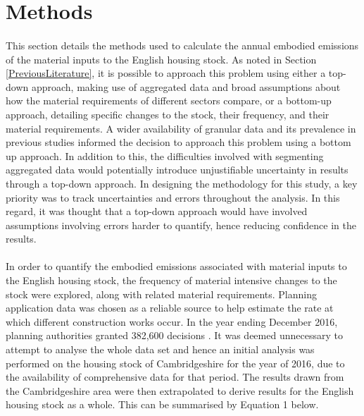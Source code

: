 \documentclass[12pt]{article}
\begin{document}

\section{Methods}
\label{methods}

\paragraph{}
This section details the methods used to calculate the annual embodied emissions of the material inputs to the English housing stock. As noted in Section \ref{PreviousLiterature}, it is possible to approach this problem using either a top-down approach, making use of aggregated data and broad assumptions about how the material requirements of different sectors compare, or a bottom-up approach, detailing specific changes to the stock, their frequency, and their material requirements. A wider availability of granular data and its prevalence in previous studies informed the decision to approach this problem using a bottom up approach. In addition to this, the difficulties involved with segmenting aggregated data would potentially introduce unjustifiable uncertainty in results through a top-down approach. In designing the methodology for this study, a key priority was to track uncertainties and errors throughout the analysis. In this regard, it was thought that a top-down approach would have involved assumptions involving errors harder to quantify, hence reducing confidence in the results. 

\paragraph{}
In order to quantify the embodied emissions associated with material inputs to the English housing stock, the frequency of material intensive changes to the stock were explored, along with related material requirements. Planning application data was chosen as a reliable source to help estimate the rate at which different construction works occur. In the year ending December 2016, planning authorities granted 382,600 decisions \citep{Department_for_Communities_and_Local_Government2017-tj}. It was deemed unnecessary to attempt to analyse the whole data set and hence an initial analysis was performed on the housing stock of Cambridgeshire for the year of 2016, due to the availability of comprehensive data for that period. The results drawn from the Cambridgeshire area were then extrapolated to derive results for the English housing stock as a whole. This can be summarised by Equation 1 below.
\end{document}
